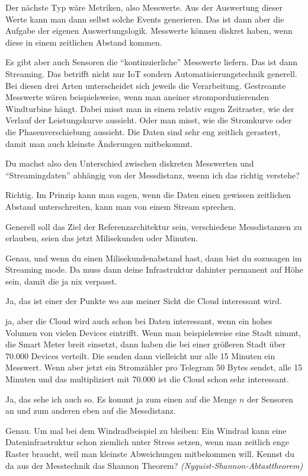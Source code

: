 Der nächste Typ wäre Metriken, also Messwerte. Aus der Auswertung dieser Werte kann man dann selbst solche Events generieren. Das ist dann aber die Aufgabe der eigenen Auswertungslogik. Messwerte können diskret haben, wenn diese in einem zeitlichen Abstand kommen. 

Es gibt aber auch Sensoren die \enquote{kontinuierliche} Messwerte liefern. Das ist dann Streaming.  Das betrifft nicht nur IoT sondern Automatisierungstechnik generell. Bei diesen drei Arten unterscheidet sich jeweils die Verarbeitung. Gestreamte Messwerte wären beispielsweise, wenn man aneiner stromporduzierenden Windturbine hängt. Dabei misst man in einem relativ engen Zeitraster, wie der Verlauf der Leistungskurve aussieht. Oder man misst, wie die Stromkurve oder die Phasenverschiebung aussieht. Die Daten sind sehr eng zeitlich gerastert, damit man auch kleinste Änderungen mitbekommt. 

\LF Du machst also den Unterschied zwischen diskreten Messwerten und \enquote{Streamingdaten} abhängig von der Messdistanz, weenn ich das richtig verstehe?

\PE Richtig. Im Prinzip kann man sagen, wenn die Daten einen gewissen zeitlichen Abstand unterschreiten, kann man von einem Stream sprechen. 

\LF Generell soll das Ziel der Referenzarchitektur sein, verschiedene Messdistanzen zu erlauben, seien das jetzt Milisekunden oder Minuten.

\PE Genau, und wenn du einen Milisekundenabstand hast, dann bist du sozusagen im Streaming mode. Da muss dann deine Infrastruktur dahinter permanent auf Höhe sein, damit die ja nix verpasst. 

\LF Ja, das ist einer der Punkte wo aus meiner Sicht die Cloud interessant wird.

\PE ja, aber die Cloud wird auch schon bei Daten interessant, wenn ein hohes Volumen von vielen Devices eintrifft. Wenn man beispielsweise eine Stadt nimmt, die Smart Meter breit einsetzt, dann haben die bei einer größeren Stadt über 70.000 Devices verteilt. Die senden dann vielleicht nur alle 15 Minuten ein Messwert. Wenn aber jetzt ein Stromzähler pro Telegram 50 Bytes sendet, alle 15 Minuten und das multipliziert mit 70.000 ist die Cloud schon sehr interessant.

\LF Ja, das sehe ich auch so. Es kommt ja zum einen auf die Menge $n$ der Sensoren an und zum anderen eben auf die Messdistanz.

\PE Genau. Um mal bei dem Windradbeispiel zu bleiben: Ein Windrad kann eine Dateninfrastruktur schon ziemlich unter Stress setzen, wenn man zeitlich enge Raster braucht, weil man kleinste Abweichungen mitbekommen will. Kennst du da aus der Messtechnik das Shannon Theorem? \textit{(Nyquist-Shannon-Abtasttheorem)}

